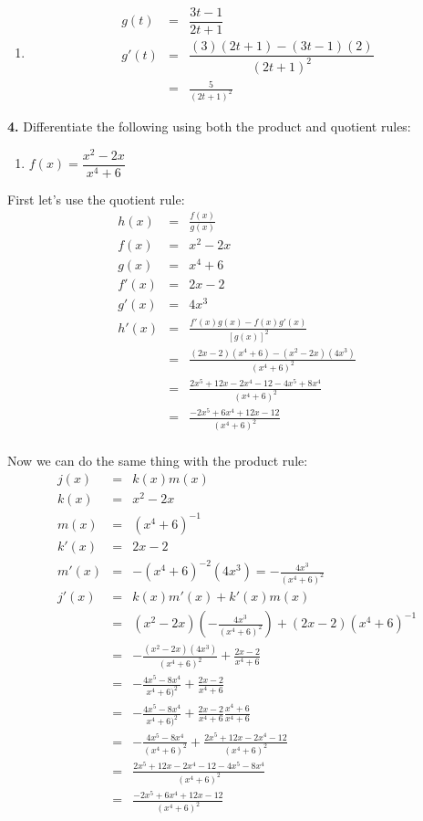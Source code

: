 \documentclass[12pt]{article}
\begin{document}
\begin{enumerate}
\item \begin{eqnarray*}
g(t) &=&  \dfrac{3t-1}{2t+1}\\
g'(t) &=& \dfrac{(3)(2t+1) - (3t-1)(2)}{(2t+1)^2}\\
&=& \frac{5}{(2t+1)^2}
\end{eqnarray*}
\end{enumerate}


\bigskip 


\noindent \textbf{4.} Differentiate the following using both the product and quotient rules:
\begin{enumerate}
\item $f(x) = \dfrac{x^2-2x}{x^4 + 6}$
\end{enumerate}

First let's use the quotient rule:
\begin{eqnarray*}
h(x) &=& \frac{f(x)}{g(x)}\\
f(x) &=& x^2 - 2x\\
g(x) &=& x^4 + 6\\
f'(x) &=& 2x - 2\\
g'(x) &=& 4x^3\\
h'(x) &=& \frac{f'(x)g(x) - f(x)g'(x)}{[g(x)]^2}\\
&=& \frac{(2x-2)(x^4+6) - (x^2 - 2x)(4x^3)}{(x^4 + 6)^2}\\
&=& \frac{2x^5 + 12x - 2x^4 - 12 - 4x^5 + 8x^4}{(x^4+6)^2}\\
&=& \frac{-2x^5 + 6x^4 + 12x - 12}{(x^4 + 6)^2}\\
\end{eqnarray*}

Now we can do the same thing with the product rule:
\begin{eqnarray*}
j(x) &=& k(x)m(x)\\
k(x) &=& x^2 - 2x\\
m(x) &=& (x^4 + 6)^{-1}\\
k'(x) &=& 2x-2\\
m'(x) &=& - (x^4 + 6)^{-2} (4x^3) = - \frac{4x^3}{(x^4 +6)^{2}}\\
j'(x) &=& k(x)m'(x) + k'(x)m(x)\\
&=& (x^2 - 2x) (  -\frac{4x^3}{(x^4 + 6)^2} ) + (2x-2)(x^4+6)^{-1}\\
&=& - \frac{(x^2 - 2x)(4x^3)}{(x^4 + 6)^2} + \frac{2x-2}{x^4+6}\\
&=& - \frac{4x^5 - 8x^4}{x^4 +6)^2} + \frac{2x - 2}{x^4 + 6}\\
&=& - \frac{4x^5 - 8x^4}{x^4 +6)^2} + \frac{2x - 2}{x^4 + 6} \frac{x^4 + 6}{x^4 + 6}\\
&=& - \frac{4x^5 - 8x^4}{(x^4 +6)^2} + \frac{2x^5 + 12x  - 2x^4 - 12}{(x^4 +6)^2}\\
&=& \frac{2x^5 + 12x  - 2x^4 - 12 - 4x^5 - 8x^4}{(x^4 +6)^2}\\
&=& \frac{-2x^5 + 6x^4 + 12x - 12}{(x^4 +6)^2}
\end{eqnarray*}
\end{document}
